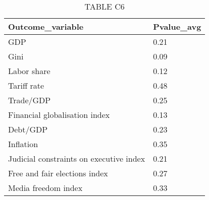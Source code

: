 \documentclass{article}
\begin{document}
\begin{table}[tbp] \centering
{}

\caption{TABLE C6}
\begin{tabularx}{\linewidth}{lC}

\toprule
{Outcome\_variable}&{Pvalue\_avg} \tabularnewline
\midrule \addlinespace[\belowrulesep]
GDP&0.21 \tabularnewline
Gini&0.09 \tabularnewline
Labor share&0.12 \tabularnewline
Tariff rate&0.48 \tabularnewline
Trade/GDP&0.25 \tabularnewline
Financial globalisation index&0.13 \tabularnewline
Debt/GDP&0.23 \tabularnewline
Inflation&0.35 \tabularnewline
Judicial constraints on executive index&0.21 \tabularnewline
Free and fair elections index&0.27 \tabularnewline
Media freedom index&0.33 \tabularnewline
\bottomrule 

\end{tabularx}
\end{table}
\end{document}

